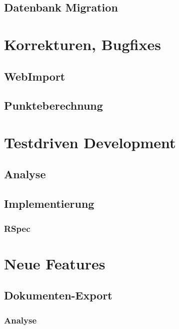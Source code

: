 \documentclass[12pt,             %
               a4paper,          %
               listof=totoc,     %
               index=totoc,      %
               bibliography=totoc,%
               oneside,         %
               BCOR1cm,          %
               english   %
               ]{scrbook}
\begin{document}
\section{Datenbank Migration}

\clearpage
\chapter{Korrekturen, Bugfixes}
\section{WebImport}

\section{Punkteberechnung}

\clearpage
\chapter{Testdriven Development}
\section{Analyse}
\section{Implementierung}
\subsection{RSpec}

\chapter{Neue Features}
\section{Dokumenten-Export}
\subsection{Analyse}
\end{document}
